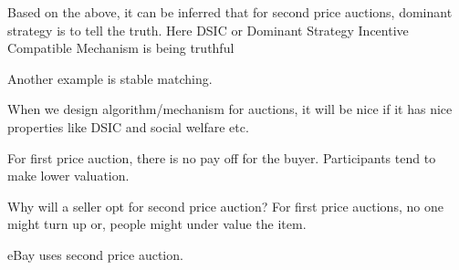 \documentclass[twoside]{article}
\begin{document}
Based on the above, it can be inferred that for second price auctions, dominant strategy is to tell the truth. Here DSIC or Dominant Strategy Incentive Compatible Mechanism is being truthful

Another example is stable matching.

When we design algorithm/mechanism for auctions, it will be nice if it has nice properties like DSIC and social welfare etc.

For first price auction, there is no pay off for the buyer. Participants tend to make lower valuation.

Why will a seller opt for second price auction?
For first price auctions, no one might turn up or, people might under value the item.

eBay uses second price auction.
\end{document}
